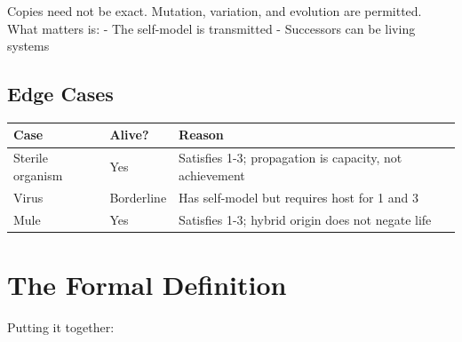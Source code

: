 \documentclass[
  11pt,
  letterpaper,
  twoside,
  openright]{book}
\begin{document}
Copies need not be exact. Mutation, variation, and evolution are
permitted. What matters is: - The self-model is transmitted - Successors
can be living systems

\subsection{Edge Cases}\label{edge-cases}

\begin{longtable}[]{@{}
  >{\raggedright\arraybackslash}p{}
  >{\raggedright\arraybackslash}p{}
  >{\raggedright\arraybackslash}p{}@{}}
\toprule\noalign{}
\begin{minipage}[b]{\linewidth}\raggedright
Case
\end{minipage} & \begin{minipage}[b]{\linewidth}\raggedright
Alive?
\end{minipage} & \begin{minipage}[b]{\linewidth}\raggedright
Reason
\end{minipage} \\
\midrule\noalign{}
\endhead
\bottomrule\noalign{}
\endlastfoot
Sterile organism & Yes & Satisfies 1-3; propagation is capacity, not
achievement \\
Virus & Borderline & Has self-model but requires host for 1 and 3 \\
Mule & Yes & Satisfies 1-3; hybrid origin does not negate life \\
\end{longtable}

\section{The Formal Definition}\label{the-formal-definition}

Putting it together:
\end{document}
